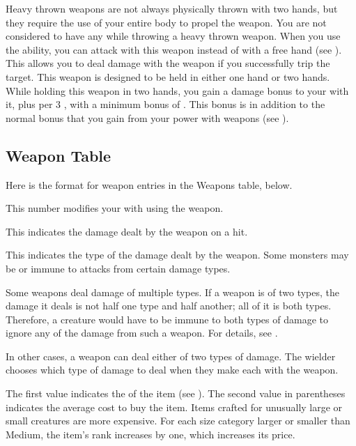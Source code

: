     Heavy thrown weapons are not always physically thrown with two hands, but they require the use of your entire body to propel the weapon.
    You are not considered to have any  while throwing a heavy thrown weapon.
     When you use the  ability, you can attack with this weapon instead of with a free hand (see ).
    This allows you to deal damage with the weapon if you successfully trip the target.
     This weapon is designed to be held in either one hand or two hands.
    While holding this weapon in two hands, you gain a  damage bonus to your  with it, plus  per 3 , with a minimum bonus of .
    This bonus is in addition to the normal bonus that you gain from your power with weapons (see ).

  \subsection{Weapon Table}
    Here is the format for weapon entries in the Weapons table, below.

     This number modifies your  with  using the weapon.

     This  indicates the damage dealt by the weapon on a hit.

     This indicates the type of the damage dealt by the weapon.
    Some monsters may be  or immune to attacks from certain damage types.

    Some weapons deal damage of multiple types. If a weapon is of two types, the damage it deals is not half one type and half another; all of it is both types.
    Therefore, a creature would have to be immune to both types of damage to ignore any of the damage from such a weapon.
    For details, see .

    In other cases, a weapon can deal either of two types of damage.
    The wielder chooses which type of damage to deal when they make each  with the weapon.

     The first value indicates the  of the item (see ).
    The second value in parentheses indicates the average cost to buy the item.
    Items crafted for unusually large or small creatures are more expensive.
    For each size category larger or smaller than Medium, the item's rank increases by one, which increases its price.

